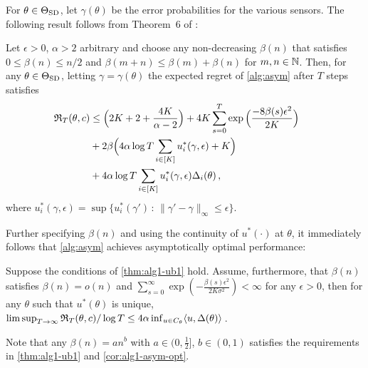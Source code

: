 \newcommand{\gap}{d}
\newcommand{\norm}[1]{\|#1\|}
For $\theta \in \Theta_{\mathrm{SD}}$, let $\gamma(\theta)$ be the error probabilities for the various sensors.
The following result follows from Theorem~6 of \cite{WGySz:NIPS15}:
\begin{thm} \label{thm:ftregret}
Let $\epsilon>0$, $\alpha>2$ arbitrary and choose any non-decreasing $\beta(n)$ that satisfies $0\le \beta(n)\le n/2$ and $\beta(m+n)\le \beta(m)+\beta(n)$ for $m,n\in \mathbb{N}$.
Then, 
for any
$\theta\in \Theta_{\mathrm{SD}}$, letting $\gamma = \gamma(\theta)$
the expected regret of \cref{alg:asym} after $T$ steps satisfies 
\begin{align*}
\mathfrak{R}_T(\theta,c)
  &\le  \Big( 2K+2+\frac{4K}{\alpha-2} \Big) 
  +  4K\sum_{s=0}^T \exp{\Big( \frac{-8\beta(s)\epsilon^2}{2K} \Big)}~~~~~ \\
 &+ 2 \beta\Big( 4\alpha\log T\sum_{i\in [K]} u_i^*(\gamma,\epsilon)+K \Big)\\
 & +  4\alpha\log T \sum_{i\in [K]} u_i^*(\gamma,\epsilon)\Delta_i(\theta) \,,
\end{align*}
where $u_i^*(\gamma,\epsilon) = \sup\{u_i^*(\gamma')\,:\, \norm{\gamma'-\gamma}_{\infty}\le \epsilon \}$.
\label{thm:alg1-ub1}
\end{thm}  
Further specifying $\beta(n)$ and using the continuity of $u^*(\cdot)$ at $\theta$, it immediately follows that \cref{alg:asym} achieves asymptotically optimal performance: 
\begin{cor}
\label{cor:alg1-asym-opt}
 Suppose the conditions of \cref{thm:alg1-ub1} hold. Assume, furthermore, that $\beta(n)$ satisfies $\beta(n) = o(n)$ and $\sum_{s=0}^\infty \exp \left( -\frac{\beta(s)\epsilon^2}{2K\sigma^2} \right)<\infty$ for any $\epsilon>0$, then for any $\theta$ such that $u^*(\theta)$ is unique, 
$
\limsup_{T\rightarrow \infty} \mathfrak{R}_T(\theta,c)/\log T \le 4\alpha \inf_{u\in C_\theta} \langle u,\Delta(\theta) \rangle\,$.
\end{cor}
Note that any $\beta(n) = an^b$ with $a\in (0,\frac{1}{2}]$, $b\in (0,1)$ satisfies the requirements in \cref{thm:alg1-ub1} and \cref{cor:alg1-asym-opt}.




